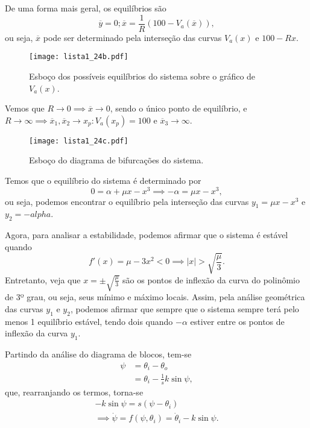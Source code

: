 \documentclass[a4paper]{report}
\begin{document}

De uma forma mais geral, os equilíbrios são \[
    \overline{y}=0 ; \overline{x} = \frac{1}{R}\left( 100 - V_a(\overline{x}) \right) 
,\] ou seja, $\overline{x}$ pode ser determinado pela interseção das curvas $V_a(x)$ e $100 -Rx$.

\begin{figure}[H]
    \centering
    \texttt{[image: lista1\_24b.pdf]}
    \caption{Esboço dos possíveis equilíbrios do sistema sobre o gráfico de $V_a(x)$.}
    \label{fig:lista1_24b-pdf}
\end{figure}


Vemos que $R\to 0 \implies \overline{x}\to 0$, sendo o único ponto de equilíbrio, e $R\to \infty \implies \overline{x}_1, \overline{x}_2\to x_p : V_a(x_p) = 100$ e $\overline{x}_3 \to \infty$.


\begin{figure}[H]
    \centering
    \texttt{[image: lista1\_24c.pdf]}
    \caption{Esboço do diagrama de bifurcações do sistema.}
    \label{fig:lista1_24c-pdf}
\end{figure}



Temos que o equilíbrio do sistema é determinado por \[
0 = \alpha +\mu x - x^3 \implies -\alpha = \mu x - x^3
,\] ou seja, podemos encontrar o equilíbrio pela interseção das curvas $y_1 = \mu x - x^3$ e $y_2=-alpha$.

Agora, para analisar a estabilidade, podemos afirmar que o sistema é estável quando \[
    f'(x) = \mu - 3x^2 < 0 \implies |x| > \sqrt{\frac{\mu}{3}} 
.\] Entretanto, veja que $x = \pm \sqrt{\frac{\mu}{3}} $ são os pontos de inflexão da curva do polinômio de 3º grau, ou seja, seus mínimo e máximo locais. Assim, pela análise geométrica das curvas $y_1$ e $y_2$, podemos afirmar que sempre que o sistema sempre terá pelo menos 1 equilíbrio estável, tendo dois quando $-\alpha$ estiver entre os pontos de inflexão da curva $y_1$.




Partindo da análise do diagrama de blocos, tem-se
\begin{align*}
    \psi &= \theta_i - \theta_o \\
	 &= \theta_i - \frac{1}{s}k\sin \psi
,\end{align*}
que, rearranjando os termos, torna-se
\begin{align*}
    -k \sin \psi = s\left( \psi - \theta_i \right) \\
    \implies  \dot{\psi} = f(\psi,\theta_i) = \dot{\theta}_i - k \sin\psi
.\end{align*}
\end{document}
